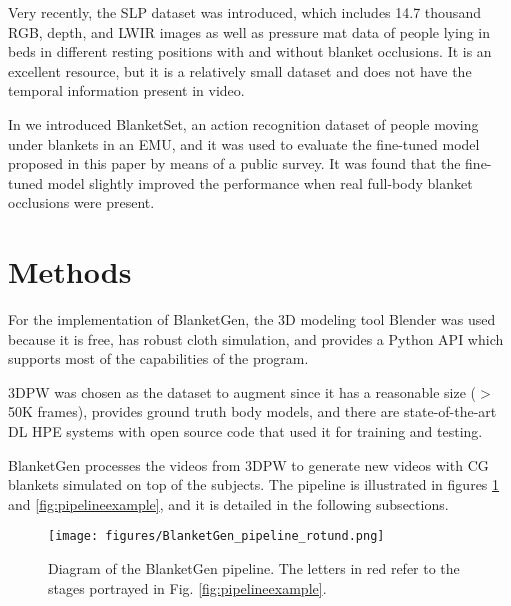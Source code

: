 \documentclass[conference]{IEEEtran}
\begin{document}
Very recently, the SLP dataset \cite{slp} was introduced, which includes 14.7 thousand RGB, depth, and LWIR images as well as pressure mat data of people lying in beds in different resting positions with and without blanket occlusions. It is an excellent resource, but it is a relatively small dataset and does not have the temporal information present in video.

In \cite{blanketset} we introduced BlanketSet, an action recognition dataset of people moving under blankets in an EMU, and it was used to evaluate the fine-tuned model proposed in this paper by means of a public survey. It was found that the fine-tuned model slightly improved the performance when real full-body blanket occlusions were present.


\section{Methods}
For the implementation of BlanketGen, the 3D modeling tool Blender \cite{blender} was used because it is free, has robust cloth simulation, and provides a Python API which supports most of the capabilities of the program.

3DPW \cite{3DPW} was chosen as the dataset to augment since it has a reasonable size (\(>\)50K frames), provides ground truth body models, and there are state-of-the-art DL HPE systems with open source code that used it for training and testing.

BlanketGen processes the videos from 3DPW to generate new videos with CG blankets simulated on top of the subjects.
The pipeline is illustrated in figures \ref{fig:pipeline} and \ref{fig:pipelineexample}, and it is detailed in the following subsections.



\begin{figure}[htpb]
\centering
\texttt{[image: figures/BlanketGen\_pipeline\_rotund.png]} 
\caption{Diagram of the BlanketGen pipeline. The letters in red refer to the stages portrayed in Fig. \ref{fig:pipelineexample}.}
\label{fig:pipeline}
\end{figure}


\end{document}
